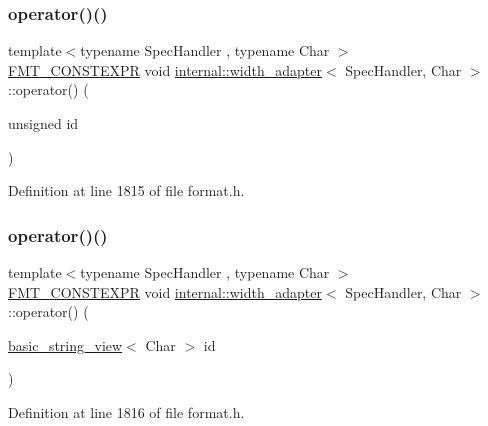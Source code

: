 \subsubsection{\texorpdfstring{operator()()}{operator()()}\hspace{0.1cm}{\footnotesize\ttfamily [2/3]}}
{\footnotesize\ttfamily template$<$typename Spec\+Handler , typename Char $>$ \\
\hyperlink{core_8h_a69201cb276383873487bf68b4ef8b4cd}{F\+M\+T\+\_\+\+C\+O\+N\+S\+T\+E\+X\+PR} void \hyperlink{structinternal_1_1width__adapter}{internal\+::width\+\_\+adapter}$<$ Spec\+Handler, Char $>$\+::operator() (\begin{DoxyParamCaption}\item[{unsigned}]{id }\end{DoxyParamCaption})\hspace{0.3cm}{\ttfamily [inline]}}



Definition at line 1815 of file format.\+h.

\mbox{\label{structinternal_1_1width__adapter_af45e17b7c094f2fb2f072ba3d6a50d2c}} 
\subsubsection{\texorpdfstring{operator()()}{operator()()}\hspace{0.1cm}{\footnotesize\ttfamily [3/3]}}
{\footnotesize\ttfamily template$<$typename Spec\+Handler , typename Char $>$ \\
\hyperlink{core_8h_a69201cb276383873487bf68b4ef8b4cd}{F\+M\+T\+\_\+\+C\+O\+N\+S\+T\+E\+X\+PR} void \hyperlink{structinternal_1_1width__adapter}{internal\+::width\+\_\+adapter}$<$ Spec\+Handler, Char $>$\+::operator() (\begin{DoxyParamCaption}\item[{\hyperlink{classbasic__string__view}{basic\+\_\+string\+\_\+view}$<$ Char $>$}]{id }\end{DoxyParamCaption})\hspace{0.3cm}{\ttfamily [inline]}}



Definition at line 1816 of file format.\+h.



